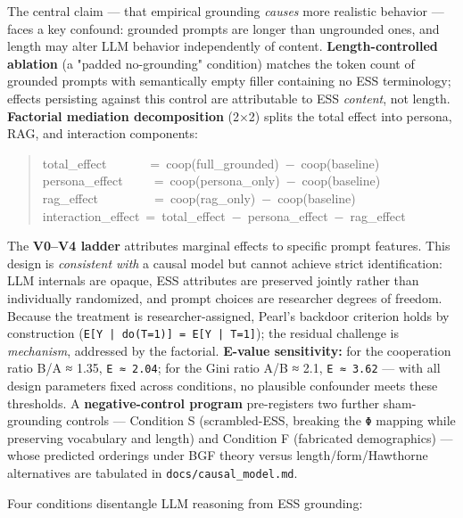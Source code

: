 
The central claim — that empirical grounding \textit{causes} more realistic behavior — faces a key confound: grounded prompts are longer than ungrounded ones, and length may alter LLM behavior independently of content. \textbf{Length-controlled ablation} (a "padded no-grounding" condition) matches the token count of grounded prompts with semantically empty filler containing no ESS terminology; effects persisting against this control are attributable to ESS \textit{content}, not length. \textbf{Factorial mediation decomposition} (2×2) splits the total effect into persona, RAG, and interaction components:

\begin{quote}\ttfamily\small\noindent
total\_effect~~~~~~~=~coop(full\_grounded)~−~coop(baseline) \\persona\_effect~~~~~=~coop(persona\_only)~−~coop(baseline) \\rag\_effect~~~~~~~~~=~coop(rag\_only)~−~coop(baseline) \\interaction\_effect~=~total\_effect~−~persona\_effect~−~rag\_effect
\end{quote}

The \textbf{V0–V4 ladder} attributes marginal effects to specific prompt features. This design is \textit{consistent with} a causal model but cannot achieve strict identification: LLM internals are opaque, ESS attributes are preserved jointly rather than individually randomized, and prompt choices are researcher degrees of freedom. Because the treatment is researcher-assigned, Pearl's backdoor criterion holds by construction (\texttt{E[Y | do(T=1)] = E[Y | T=1]}); the residual challenge is \textit{mechanism}, addressed by the factorial. \textbf{E-value sensitivity:} for the cooperation ratio B/A ≈ 1.35, \texttt{E ≈ 2.04}; for the Gini ratio A/B ≈ 2.1, \texttt{E ≈ 3.62} — with all design parameters fixed across conditions, no plausible confounder meets these thresholds. A \textbf{negative-control program} pre-registers two further sham-grounding controls — Condition S (scrambled-ESS, breaking the \texttt{Φ} mapping while preserving vocabulary and length) and Condition F (fabricated demographics) — whose predicted orderings under BGF theory versus length/form/Hawthorne alternatives are tabulated in \texttt{docs/causal\_model.md}.


Four conditions disentangle LLM reasoning from ESS grounding:


